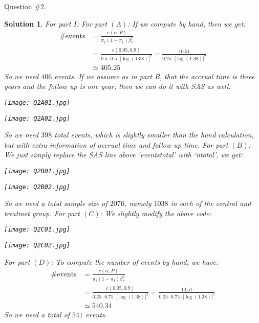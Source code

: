 \documentclass[11pt]{article}
\newtheorem{sol}{Solution}
\begin{document}
Question $\#2$.
\begin{sol}
	For part $I$:\vskip 2mm
	For part $(A)$:\vskip 2mm
	If we compute by hand, then we get:
	\begin{align*}
		\#\text{events} &= \frac{c(\alpha, P)}{\pi_1(1 - \pi_1)\beta^2_{\ast}}\\
		&= \frac{c(0.05, 0.9)}{0.5\cdot 0.5 \cdot \Big[\log(1.38)\Big]^2} = \frac{10.51}{0.25\cdot \Big[\log(1.38)\Big]^2}\\
		&\simeq 405.25
	\end{align*}
	So we need $406$ events.\vskip 2mm
	If we assume as in part B, that the accrual time is three years and the follow up is one year, then we can do it with SAS as well:
	\begin{center}
		\texttt{[image: Q2A01.jpg]}
	\end{center}
	\begin{center}
		\texttt{[image: Q2A02.jpg]}
	\end{center}
	So we need $398$ total events, which is slightly smaller than the hand calculation, but with extra information of accrual time and follow up time.\vskip 2mm
	For part $(B)$:\vskip 2mm
	We just simply replace the SAS line above `eventstotal' with `ntotal', we get:
	\begin{center}
		\texttt{[image: Q2B01.jpg]}
	\end{center}
	\begin{center}
		\texttt{[image: Q2B02.jpg]}
	\end{center}
	So we need a total sample size of $2076$, namely $1038$ in each of the control and treatmet group.\vskip 2mm
	For part $(C)$:\vskip 2mm
	We slightly modify the above code:
	\begin{center}
		\texttt{[image: Q2C01.jpg]}
	\end{center}
	\begin{center}
		\texttt{[image: Q2C02.jpg]}
	\end{center}
	For part $(D)$:\vskip 2mm
	To compute the number of events by hand, we have:
	\begin{align*}
		\#\text{events} &= \frac{c(\alpha, P)}{\pi_1(1 - \pi_1)\beta^2_{\ast}}\\
		&= \frac{c(0.05, 0.9)}{0.25\cdot 0.75 \cdot \Big[\log(1.38)\Big]^2} = \frac{10.51}{0.25\cdot 0.75\cdot \Big[\log(1.38)\Big]^2}\\
		&\simeq 540.34
	\end{align*}
	So we need a total of $541$ events.\vskip 2mm

\end{sol}
\end{document}

